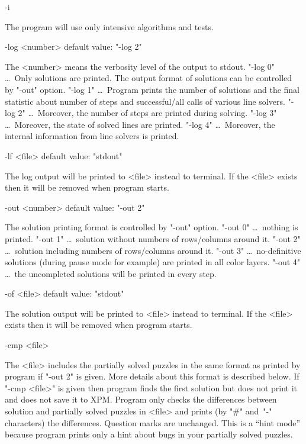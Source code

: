 \para -i      {}                           {}

  The program will use only intensive algorithms and tests.

\para -log <number>              default value: "-log 2"

   The <number> means the verbosity level of the output to stdout.
\bod   "-log 0" \dots\ Only solutions are printed. The output format of
       solutions can be controlled by "-out" option.
\bod   "-log 1" \dots\ Program prints the number of solutions and
       the final statistic about number of steps and successful/all
       calls of various line solvers. 
\bod   "-log 2" \dots\ Moreover, the number of steps are printed
       during solving.
\bod   "-log 3" \dots\ Moreover, the state of solved lines are printed.
\bod   "-log 4" \dots\ Moreover, the internal information from line
       solvers is printed.

\para -lf <file>                 default value: "stdout"

   The log output will be printed to <file> instead to terminal.
   If the <file> exists then it will be removed when program starts.

\para -out <number>              default value: "-out 2"

   The solution printing format is controlled by "-out" option.
\bod   "-out 0" \dots\ nothing is printed.
\bod   "-out 1" \dots\ solution without numbers of rows/columns around it.
\bod   "-out 2" \dots\ solution including numbers of rows/columns around it.
\bod   "-out 3" \dots\ no-definitive solutions (during pause mode for example)
        are printed in all color layers.
\bod   "-out 4" \dots\ the uncompleted solutions will be printed 
                in every step.

\para -of <file>                 default value: "stdout"

   The solution output will be printed to <file> instead to terminal.
   If the <file> exists then it will be removed when program starts.

\para -cmp <file>               

   The <file> includes the partially solved puzzles in the same
   format as printed by program if "-out 2" is given. More details
   about this format is described below.
   If "-cmp <file>" is given then program finds the first solution 
   but does not print it and does not save it to XPM. Program only
   checks the differences between solution and partially solved 
   puzzles in <file> and prints (by "#" and~"-" characters) the 
   differences. Question marks are unchanged. This is a ``hint mode''
   because program prints only a hint about bugs in your partially
   solved puzzles.

